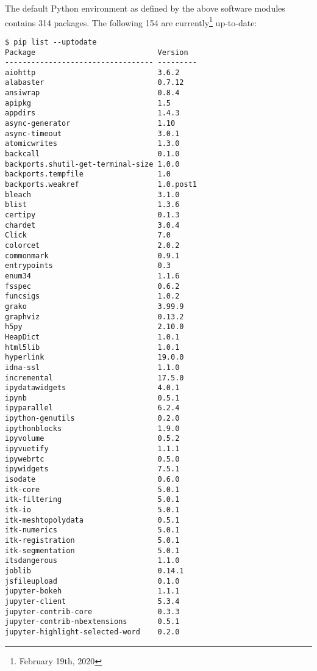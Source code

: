 The default Python environment as defined by the above software modules contains 314 packages.
The following 154 are currently\footnote{February 19th, 2020} up-to-date:
%
\begin{verbatim}
$ pip list --uptodate
Package                            Version
---------------------------------- ---------
aiohttp                            3.6.2
alabaster                          0.7.12
ansiwrap                           0.8.4
apipkg                             1.5
appdirs                            1.4.3
async-generator                    1.10
async-timeout                      3.0.1
atomicwrites                       1.3.0
backcall                           0.1.0
backports.shutil-get-terminal-size 1.0.0
backports.tempfile                 1.0
backports.weakref                  1.0.post1
bleach                             3.1.0
blist                              1.3.6
certipy                            0.1.3
chardet                            3.0.4
Click                              7.0
colorcet                           2.0.2
commonmark                         0.9.1
entrypoints                        0.3
enum34                             1.1.6
fsspec                             0.6.2
funcsigs                           1.0.2
grako                              3.99.9
graphviz                           0.13.2
h5py                               2.10.0
HeapDict                           1.0.1
html5lib                           1.0.1
hyperlink                          19.0.0
idna-ssl                           1.1.0
incremental                        17.5.0
ipydatawidgets                     4.0.1
ipynb                              0.5.1
ipyparallel                        6.2.4
ipython-genutils                   0.2.0
ipythonblocks                      1.9.0
ipyvolume                          0.5.2
ipyvuetify                         1.1.1
ipywebrtc                          0.5.0
ipywidgets                         7.5.1
isodate                            0.6.0
itk-core                           5.0.1
itk-filtering                      5.0.1
itk-io                             5.0.1
itk-meshtopolydata                 0.5.1
itk-numerics                       5.0.1
itk-registration                   5.0.1
itk-segmentation                   5.0.1
itsdangerous                       1.1.0
joblib                             0.14.1
jsfileupload                       0.1.0
jupyter-bokeh                      1.1.1
jupyter-client                     5.3.4
jupyter-contrib-core               0.3.3
jupyter-contrib-nbextensions       0.5.1
jupyter-highlight-selected-word    0.2.0

\end{verbatim}
